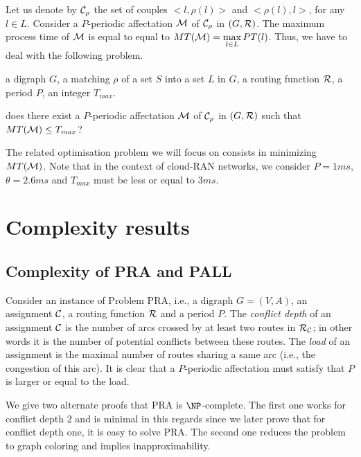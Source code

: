 \documentclass{article}
\begin{document}
Let us denote by ${\cal C}_{\rho}$ the set of couples $<l,\rho(l)>$ and $<\rho(l),l>$, for any $l \in L$. Consider a $P$-periodic affectation ${\cal M}$ of ${\cal C}_{\rho}$ in $(G,{\cal R})$. The maximum process time of ${\cal M}$ is equal to equal to $MT({\cal M})=\max\limits_{l \in L} PT(l)$. Thus, we have to deal with the following problem.\\


  a digraph $G$, a matching $\rho$ of a set $S$ into a set $L$ in $G$, a routing function $\cal R$, a period $P$, an integer $T_{max}$.

 does there exist  a $P$-periodic affectation ${\cal M}$ of ${\cal C}_{\rho}$ in $(G,{\cal R})$ such that $MT({\cal M}) \leq T_{max}$?

The related optimisation problem we will focus on  consists in minimizing  $MT({\cal M})$. Note that in the context of cloud-RAN networks, we consider $P=1ms$, $\theta=2.6ms$ and $T_{max}$ must be less or equal to $3ms$.

 \section{Complexity results}
\subsection{Complexity of PRA and PALL}
Consider an instance of Problem PRA, i.e., a digraph $G=(V,A)$, an assignment $\cal C$, a routing function $\cal R$ and a period $P$. 
The \emph{conflict depth} of an assignment $\cal C$ is the  number of arcs crossed by at least two routes in ${\cal R}_{\cal C}$; in other words it is the number of potential conflicts between these routes. 
The \emph{load} of  an assignment is the maximal number of routes sharing a same arc (i.e., the congestion of this arc).
It is clear that a $P$-periodic affectation must satisfy that $P$ is larger or equal to the load.

We give two alternate proofs that PRA is $\NP$-complete.
The first one works for conflict depth $2$ and is minimal in this regards since we later prove that for conflict depth one,
it is easy to solve PRA. The second one reduces the problem to graph coloring and implies inapproximability. \\
 
\end{document}
